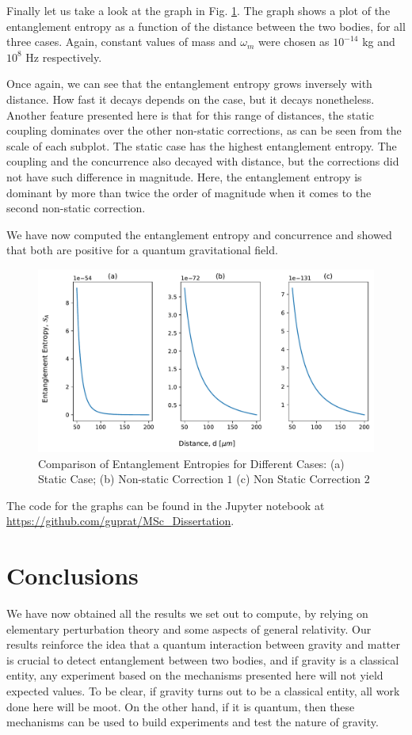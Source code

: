 \documentclass[12pt,a4paper]{report}
\theoremstyle{plain}
\theoremstyle{definition}
\theoremstyle{remark}
\begin{document}
Finally let us take a look at the graph in Fig. \ref{fig: EE2}. The graph shows a plot of the entanglement entropy as a function of the distance between the two bodies, for all three cases. Again, constant values of mass and $\omega_m$ were chosen as $10^{-14}$ kg and $10^8$ Hz respectively.

Once again, we can see that the entanglement entropy grows inversely with distance. How fast it decays depends on the case, but it decays nonetheless. Another feature presented here is that for this range of distances, the static coupling dominates over the other non-static corrections, as can be seen from the scale of each subplot. The static case has the highest entanglement entropy. The coupling and the concurrence also decayed with distance, but the corrections did not have such difference in magnitude. Here, the entanglement entropy is dominant by more than 
twice the order of magnitude when it comes to the second non-static correction.

We have now computed the entanglement entropy and concurrence and showed that both are positive for a quantum gravitational field.

\begin{figure}[h]
    \centering
    \includegraphics[width=15cm]{EECases.pdf}
    \caption{Comparison of Entanglement Entropies for Different Cases:  (a) Static Case; (b) Non-static Correction $1$ (c) Non Static Correction $2$}
    \label{fig: EE2}
\end{figure}

The code for the graphs can be found in the Jupyter notebook at \url{https://github.com/guprat/MSc_Dissertation}.
\newpage
\chapter{Conclusions}
We have now obtained all the results we set out to compute, by relying on elementary perturbation theory and some aspects of general relativity. Our results reinforce the idea that a quantum interaction between gravity and matter is crucial to detect entanglement between two bodies, and if gravity is a classical entity, any experiment based on the mechanisms presented here will not yield expected values. To be clear, if gravity turns out to be a classical entity, all work done here will be moot. On the other hand, if it is quantum, then these mechanisms can be used to build experiments and test the nature of gravity.
\end{document}
